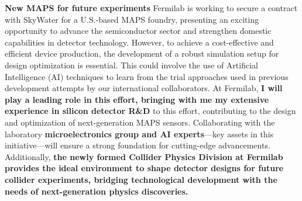 {\begin{flushleft}
\textbf{New MAPS for future experiments}
Fermilab is working to secure a contract with SkyWater for a U.S.-based MAPS foundry, presenting an exciting opportunity to advance the semiconductor sector and strengthen domestic capabilities in detector technology. However, to achieve a cost-effective and efficient device production, the development of a robust simulation setup for design optimization is essential. This could involve the use of Artificial Intelligence (AI) techniques to learn from the trial approaches used in previous development attempts by our international collaborators. %
At Fermilab, {\bf I will play a leading role in this effort, bringing with me my extensive experience in silicon detector R\&D} to this effort, contributing to the design and optimization of next-generation MAPS sensors. Collaborating with the laboratory {\bf microelectronics group and AI experts}—key assets in this initiative—will ensure a strong foundation for cutting-edge advancements. Additionally, \textbf{the newly formed Collider Physics Division at Fermilab provides the ideal environment to shape detector designs for future collider experiments, bridging technological development with the needs of next-generation physics discoveries.}


 




\end{flushleft}}
